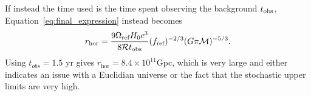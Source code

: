 \documentclass[]{article}
\newcommand{\Ogw}{\Omega_{\mathrm{gw}}}
\begin{document}
If instead the time used is the time spent observing the background $t_{\rm obs}$, Equation~\ref{eq:final_expression} instead becomes
\begin{equation}
r_{\text{hor}}=\frac{9\Omega_{\text{ref}} H_0 c^3}{8 \mathcal{R} t_{\rm obs}} (f_{\text{ref}})^{-2/3} ( G \pi \mathcal{M})^{-5/3} .
\end{equation}
Using $t_{obs} = 1.5$ yr gives $r_{\text{hor}} = 8.4 \times 10^{11}$Gpc, which is very large and either indicates an issue with a Euclidian universe or the fact that the stochastic upper limits are very high.

%
{}

\end{document}
